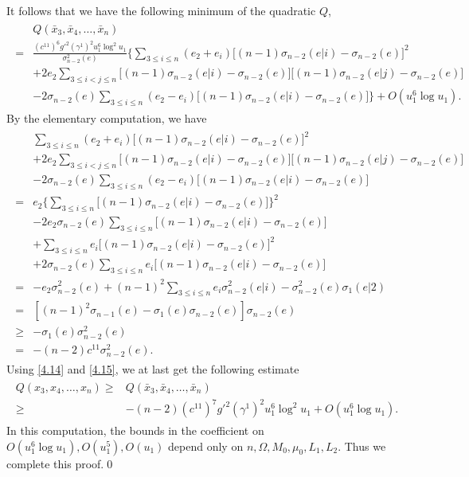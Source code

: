 \documentclass[11pt]{amsart}
\numberwithin{equation}{section}
\begin{document}
It follows that we have the following minimum of the quadratic $Q$,
\begin{align}\label{4.14}
\begin{split}
&Q(\bar{x}_3, \bar{x}_4,\ldots, \bar{x}_n)\\
=&\frac{(c^{11})^6g'^2(\gamma^1)^2u_1^6\log^2 u_1}{\sigma^2_{n-2}(e)}\bigg\{\sum_{3\leq i\leq n}(e_2+e_i)\big[(n-1)\sigma_{n-2}(e|i)-\sigma_{n-2}(e)\big]^2
\\&+2e_2\sum_{3\leq i< j\leq n}\big[(n-1)\sigma_{n-2}(e|i)-\sigma_{n-2}(e)\big] \big[(n-1)\sigma_{n-2}(e|j)-\sigma_{n-2}(e)\big]\\&
-2\sigma_{n-2}(e)\sum_{3\leq i\leq n}(e_2-e_i)\big[(n-1)\sigma_{n-2}(e|i)-\sigma_{n-2}(e)\big]\bigg\}
+O(u_1^6\log u_1).
\end{split}
\end{align}
By the elementary computation, we have
\begin{align}\label{4.15}
\begin{split}
&\sum_{3\leq i\leq n}(e_2+e_i)\big[(n-1)\sigma_{n-2}(e|i)-\sigma_{n-2}(e)\big]^2
\\&+2e_2\sum_{3\leq i< j\leq n}\big[(n-1)\sigma_{n-2}(e|i)-\sigma_{n-2}(e)\big] \big[(n-1)\sigma_{n-2}(e|j)-\sigma_{n-2}(e)\big]\\&
-2\sigma_{n-2}(e)\sum_{3\leq i\leq n}(e_2-e_i)\big[(n-1)\sigma_{n-2}(e|i)-\sigma_{n-2}(e)\big]\\
=&e_2\big\{\sum_{3\leq i\leq n}\big[(n-1)\sigma_{n-2}(e|i)-\sigma_{n-2}(e)\big]\big\}^2\\&
-2e_2\sigma_{n-2}(e)\sum_{3\leq i\leq n}\big[(n-1)\sigma_{n-2}(e|i)-\sigma_{n-2}(e)\big]\\&
+\sum_{3\leq i\leq n}e_i\big[(n-1)\sigma_{n-2}(e|i)-\sigma_{n-2}(e)\big]^2\\&
+2\sigma_{n-2}(e)\sum_{3\leq i\leq n}e_i\big[(n-1)\sigma_{n-2}(e|i)-\sigma_{n-2}(e)\big]\\
=&-e_2\sigma_{n-2}^2(e)+(n-1)^2\sum_{3\leq i\leq n}e_i\sigma^2_{n-2}(e|i)-\sigma_{n-2}^2(e)\sigma_{1}(e|2)\\
=&[(n-1)^2\sigma_{n-1}(e)-\sigma_{1}(e)\sigma_{n-2}(e)]\sigma_{n-2}(e)\\
\geq &-\sigma_{1}(e)\sigma^2_{n-2}(e)\\
=&-(n-2)c^{11}\sigma^2_{n-2}(e).
\end{split}
\end{align}
Using \eqref{4.14} and \eqref{4.15},  we at last  get the following estimate
\begin{align}\label{4.16}
\begin{split}
Q(x_3, x_4,\ldots, x_n)\geq&Q(\bar{x}_3, \bar{x}_4,\ldots, \bar{x}_n)\\
\geq &-(n-2)(c^{11})^7g'^2(\gamma^1)^2u_1^6\log^2 u_1+O(u_1^6\log u_1).
\end{split}
\end{align}
 In this computation, the bounds in the coefficient on $O(u_1^6\log u_1), O(u_1^5), O(u_1)$ depend only on $n, \Omega,  M_0, \mu_0,  L_1, L_2$. Thus we complete this proof.\qed
\end{document}
